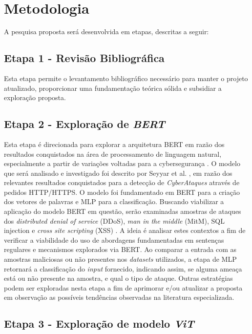 \section{Metodologia}

A pesquisa proposta será desenvolvida em etapas, descritas a seguir:

\subsection{Etapa 1 - Revisão Bibliográfica}

Esta etapa permite o levantamento bibliográfico necessário para manter o projeto atualizado, proporcionar uma fundamentação teórica sólida e subsidiar a exploração proposta.

\subsection{Etapa 2 - Exploração de \textit{BERT}}

Esta etapa é direcionada para explorar a arquitetura BERT em razão dos resultados conquistados na área de processamento de linguagem natural, especialmente a partir de variações voltadas para a cybersegurança \cite{ranade2021cybert}. O modelo que será analisado e investigado foi descrito por Seyyar et al. \cite{seyyar2022attack}, em razão dos relevantes resultados conquistados para a detecção de \textit{CyberAtaques} através de pedidos HTTP/HTTPS. O modelo foi fundamentado em BERT para a criação dos vetores de palavras e MLP para a classificação. Buscando viabilizar a aplicação do modelo BERT em questão, serão examinadas amostras de ataques dos \textit{distributed denial of service} (DDoS), \textit{man in the middle} (MitM), SQL injection e \textit{cross site scripting} (XSS) \cite{luxemburk2021detection}. A ideia é analisar estes contextos a fim de verificar a viabilidade do uso de abordagens fundamentadas em sentenças regulares e mecanismos explorados via BERT. Ao comparar a entrada com as amostras maliciosas ou não presentes nos \textit{datasets} utilizados, a etapa de MLP retornará a classificação do \textit{input} fornecido, indicando assim, se alguma ameaça está ou não presente na amostra, e qual o tipo de ataque. Outras estratégias podem ser exploradas nesta etapa a fim de aprimorar e/ou atualizar a proposta em observação as possíveis tendências observadas na literatura especializada.  

\subsection{Etapa 3 - Exploração de modelo \textit{ViT}}
    

